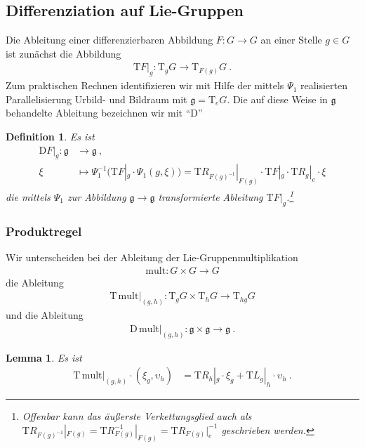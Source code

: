 \documentclass[10pt,a4paper]{article}
\theoremstyle{mytheorem}
\newtheorem{lemma}[theorem]{Lemma}
\theoremstyle{mydefinition}
\newtheorem{definition}[theorem]{Definition}
\newcommand{\Dt}{\mathrm{D}}
\newcommand{\Tt}{\mathrm{T}}
\newcommand{\fg}{\mathfrak{g}}
\begin{document}
\subsection{Differenziation auf Lie-Gruppen}

Die Ableitung einer differenzierbaren Abbildung $F:G\rightarrow G$ an einer Stelle $g\in G$ ist zunächst die Abbildung 
\begin{align*}
	\Tt F|_g:
	\Tt_gG\rightarrow\Tt_{F(g)}G
	\ .
\end{align*}
Zum praktischen Rechnen identifizieren wir mit Hilfe der mittels $\Psi_1$ realisierten Parallelisierung Urbild- und Bildraum mit $\mathfrak{g}=\Tt_eG$.
Die auf diese Weise in $\mathfrak{g}$ behandelte Ableitung bezeichnen wir mit ``$\Dt$''

\begin{definition}
Es ist 
\begin{align*}
	\Dt F|_g: 
	\mathfrak{g} &\rightarrow \mathfrak{g}
	\ ,\nonumber\\
	\xi &\mapsto 
	\Psi_1^{-1}\big(
		\Tt F|_g
		\cdot \Psi_1(g, \xi)
	\big)
	=
	\Tt R_{F(g)^{-1}}|_{F(g)}
	\cdot \Tt F|_g
	\cdot \Tt R_{g}|_e\cdot\xi
\end{align*}
die mittels $\Psi_1$ zur Abbildung $\fg\rightarrow\fg$ transformierte Ableitung $\Tt F|_g$.\footnote{
	Offenbar kann das äußerste Verkettungsglied auch als $\Tt R_{F(g)^{-1}}|_{F(g)}=\Tt R_{F(g)}^{-1}|_{F(g)}=\Tt R_{F(g)}|_e^{-1}$ geschrieben werden.

}
\end{definition}

\subsubsection{Produktregel}

Wir unterscheiden bei der Ableitung der Lie-Gruppenmultiplikation
\begin{align*}
	\mathrm{mult}:G\times G\rightarrow G
\end{align*}
die Ableitung
\begin{align*}
	\Tt\,\mathrm{mult}|_{(g,h)}:\Tt_gG\times\Tt_hG\rightarrow\Tt_{hg}G
\end{align*}
und die Ableitung
\begin{align*}
	\Dt\,\mathrm{mult}|_{(g,h)}:\fg\times\fg\rightarrow\fg
	\ .
\end{align*}

\begin{lemma}
\label{th:Tmult}
Es ist
\begin{align*}
	\Tt\,\mathrm{mult}|_{(g,h)}\cdot (\xi_g, \upsilon_h)
	&= \Tt R_h|_g\cdot\xi_g + \Tt L_g|_h\cdot\upsilon_h
	\ .
\end{align*}
\end{lemma}
\end{document}
